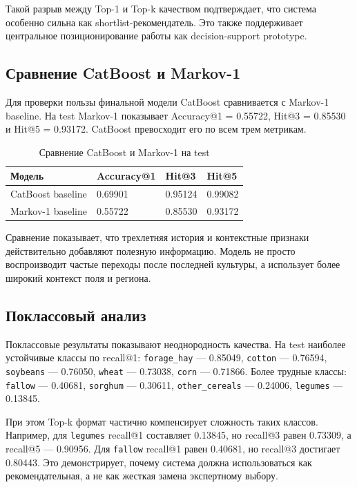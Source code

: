 \documentclass[a4paper,article,14pt]{extarticle}
\begin{document}
Такой разрыв между Top-1 и Top-k качеством подтверждает, что система особенно сильна как shortlist-рекомендатель. Это также поддерживает центральное позиционирование работы как decision-support prototype.

\subsection{Сравнение CatBoost и Markov-1}

Для проверки пользы финальной модели CatBoost сравнивается с Markov-1 baseline. На test Markov-1 показывает Accuracy@1 = 0.55722, Hit@3 = 0.85530 и Hit@5 = 0.93172. CatBoost превосходит его по всем трем метрикам.

\begin{center}
\begin{longtable}{|p{5cm}|p{3cm}|p{3cm}|p{3cm}|}
\caption{Сравнение CatBoost и Markov-1 на test}\\
\hline
Модель & Accuracy@1 & Hit@3 & Hit@5\\
\hline
CatBoost baseline & 0.69901 & 0.95124 & 0.99082\\
\hline
Markov-1 baseline & 0.55722 & 0.85530 & 0.93172\\
\hline
\end{longtable}
\end{center}

Сравнение показывает, что трехлетняя история и контекстные признаки действительно добавляют полезную информацию. Модель не просто воспроизводит частые переходы после последней культуры, а использует более широкий контекст поля и региона.

\subsection{Поклассовый анализ}

Поклассовые результаты показывают неоднородность качества. На test наиболее устойчивые классы по recall@1: \texttt{forage\_hay} --- 0.85049, \texttt{cotton} --- 0.76594, \texttt{soybeans} --- 0.76050, \texttt{wheat} --- 0.73038, \texttt{corn} --- 0.71866. Более трудные классы: \texttt{fallow} --- 0.40681, \texttt{sorghum} --- 0.30611, \texttt{other\_cereals} --- 0.24006, \texttt{legumes} --- 0.13845.

При этом Top-k формат частично компенсирует сложность таких классов. Например, для \texttt{legumes} recall@1 составляет 0.13845, но recall@3 равен 0.73309, а recall@5 --- 0.90956. Для \texttt{fallow} recall@1 равен 0.40681, но recall@3 достигает 0.80443. Это демонстрирует, почему система должна использоваться как рекомендательная, а не как жесткая замена экспертному выбору.
\end{document}
